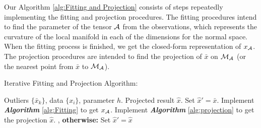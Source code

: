 \documentclass{article}
\theoremstyle{remark}
\begin{document}
Our Algorithm \ref{alg:Fitting and Projection} consists of steps repeatedly implementing the fitting and projection procedures. The fitting procedures intend to find the parameter of the tensor $\cal A$ from the observations, which represents the curvature of the local manifold in each of the dimensions for the normal space. When the fitting process is finished, we get the closed-form representation of $x_{\cal A}$. The projection procedures are intended to find the projection of $\bar{x}$ on $\cal M_A$ (or the nearest point from  $\bar{x}$ to $\cal M_A$). %
\begin{algorithm}[H]
\caption{Iterative Fitting and Projection Algorithm:}
\label{alg:Fitting and Projection}
\begin{algorithmic}
 Outliers $\{\bar{x}_k\}$, data $\{x_i\}$, parameter $h$.
 Projected result $\hat{x}$.
\STATE Set $\hat{x}' = \bar{x}$.
\REPEAT
\STATE Implement {\bfseries {\it  Algorithm}} \ref{alg:Fitting} to get $x_{\cal A}$.
\STATE Implement {\bfseries {\it  Algorithm}} \ref{alg:projection} to get the projection $\hat{x}$.
, {\bfseries otherwise:} Set $\hat{x}'=\hat{x}$
\ENDFOR
\end{algorithmic}
\end{algorithm}
%
\end{document}
